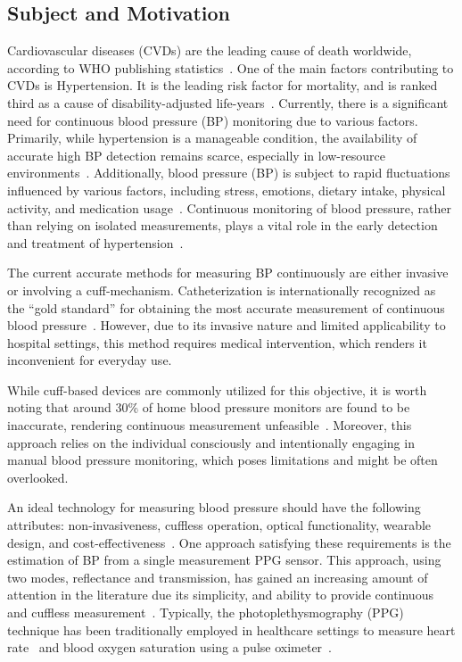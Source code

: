 \subsection{Subject and Motivation}
\label{subsec:subject_motivation}

Cardiovascular diseases (CVDs) are the leading cause of death worldwide, according to WHO publishing statistics~\cite{WorldHealthStatistics2023}.
One of the main factors contributing to CVDs is Hypertension.
It is the leading risk factor for mortality, and is ranked third as a cause of disability-adjusted life-years~\cite{ezzatiSelectedMajorRisk2002}.
Currently, there is a significant need for continuous blood pressure (BP) monitoring due to various factors.
Primarily, while hypertension is a manageable condition, the availability of accurate high BP detection remains scarce, especially in low-resource environments~\cite{burtPrevalenceHypertensionUS1995}.
Additionally, blood pressure (BP) is subject to rapid fluctuations influenced by various factors, including stress, emotions, dietary intake, physical activity, and medication usage~\cite{poonCufflessNoninvasiveMeasurements2005}.
Continuous monitoring of blood pressure, rather than relying on isolated measurements, plays a vital role in the early detection and treatment of hypertension~\cite{el-hajjDeepLearningModels2021}.

The current accurate methods for measuring BP continuously are either invasive or involving a cuff-mechanism.
Catheterization is internationally recognized as the \enquote{gold standard} for obtaining the most accurate measurement of continuous blood pressure~\cite{sharmaCuffLessContinuousBlood2017}.
However, due to its invasive nature and limited applicability to hospital settings, this method requires medical intervention, which renders it inconvenient for everyday use.

While cuff-based devices are commonly utilized for this objective, it is worth noting that around 30\% of home blood pressure monitors are found to be inaccurate, rendering continuous measurement unfeasible~\cite{leungHypertensionCanada20162016, seboBloodPressureMeasurements2014}.
Moreover, this approach relies on the individual consciously and intentionally engaging in manual blood pressure monitoring, which poses limitations and might be often overlooked.

An ideal technology for measuring blood pressure should have the following attributes: non-invasiveness, cuffless operation, optical functionality, wearable design, and cost-effectiveness~\cite{el-hajjDeepLearningModels2021}.
One approach satisfying these requirements is the estimation of BP from a single measurement PPG sensor.
This approach, using two modes, reflectance and transmission, has gained an increasing amount of attention in the literature due its simplicity, and ability to provide continuous and cuffless measurement~\cite{el-hajjDeepLearningModels2021}.
Typically, the photoplethysmography (PPG) technique has been traditionally employed in healthcare settings to measure heart rate~\cite{reyesWirelessPhotoplethysmographicDevice2012} and blood oxygen saturation using a pulse oximeter~\cite{yoonMultipleDiagnosisBased2002}.

